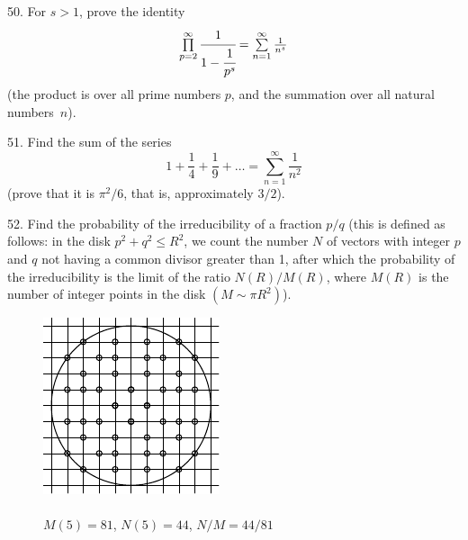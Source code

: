 \begin{problem}{50.}
	For $s>1$, prove the identity
	$$
	\textstyle\prod\limits_{p=2}^{\infty} \cfrac{1}{1-\cfrac{1}{p^s}}=\sum\limits_{n=1}^{\infty} \frac{1}{n^s}
	$$ 
	(the product is over all prime numbers $p$, and the summation over all natural numbers~$n$).
\end{problem}

\begin{problem}{51.}
	Find the sum of the series
	$$
	1+ \frac{1}{4}+ \frac{1}{9}+\dots=\textstyle\sum\limits_{n=1}^{\infty} \frac{1}{n^2}
	$$
	(prove that it is $\pi^2/6$, that is, approximately $3/2$). 
\end{problem}

\begin{problem}{52.} 
	Find the probability of the irreducibility of a fraction $p/q$ (this is defined as follows:
	in the disk $p^2+q^2 \leqslant R^2$, we count the number $N$ of vectors with integer
	$p$ and $q$ not having a common divisor greater than 1, after which the probability of the irreducibility is the
	limit of the ratio $N(R)/M(R)$, where $M(R)$ is the number of integer points in the disk $(M \sim \pi R^2)$).
	\begin{figure}[h]
	\footnotesize
	\centering
	 \includegraphics{taskbook-36}\\{\ } \\
	$M(5)=81$, $N(5)=44$, $N/M = 44/81$
	\end{figure}
\end{problem}


